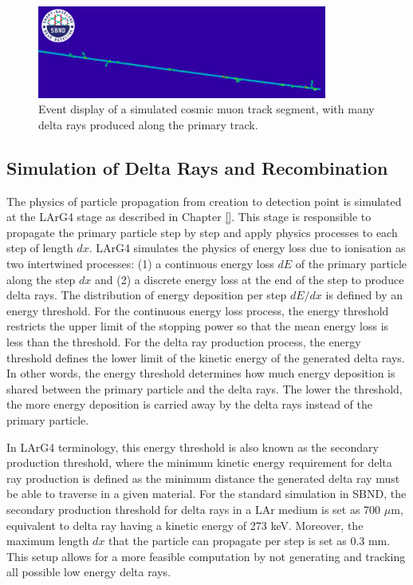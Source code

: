 \begin{figure}[thp] 
\centering    
\includegraphics[width=0.85\textwidth]{delta_ray_evd}
\caption[delta_ray_evd]{
Event display of a simulated cosmic muon track segment, with many delta rays produced along the primary track.
}
\label{fig:delta_ray_evd}
\end{figure}

\subsection{Simulation of Delta Rays and Recombination}
\label{sec:simDeltaRay}

The physics of particle propagation from creation to detection point is simulated at the LArG4 stage as described in Chapter \ref{}.
This stage is responsible to propagate the primary particle step by step and apply physics processes to each step of length $dx$.
LArG4 simulates the physics of energy loss due to ionisation as two intertwined processes: (1) a continuous energy loss $dE$ of the primary particle along the step $dx$ and (2) a discrete energy loss at the end of the step to produce delta rays.
The distribution of energy deposition per step $dE/dx$ is defined by an energy threshold.
For the continuous energy loss process, the energy threshold restricts the upper limit of the stopping power so that the mean energy loss is less than the threshold.
For the delta ray production process, the energy threshold defines the lower limit of the kinetic energy of the generated delta rays.
In other words, the energy threshold determines how much energy deposition is shared between the primary particle and the delta rays. 
The lower the threshold, the more energy deposition is carried away by the delta rays instead of the primary particle. 

In LArG4 terminology, this energy threshold is also known as the secondary production threshold, where the minimum kinetic energy requirement for delta ray production is defined as the minimum distance the generated delta ray must be able to traverse in a given material. 
For the standard simulation in SBND, the secondary production threshold for delta rays in a LAr medium is set as 700 $\mu$m, equivalent to delta ray having a kinetic energy of 273 keV.
Moreover, the maximum length $dx$ that the particle can propagate per step is set as 0.3 mm.
This setup allows for a more feasible computation by not generating and tracking all possible low energy delta rays.

